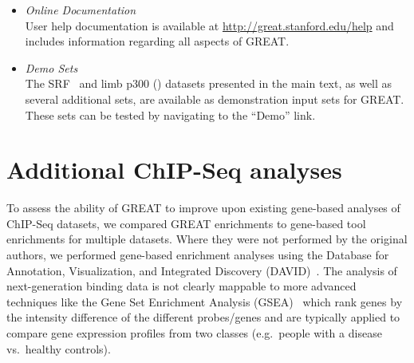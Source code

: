 \begin{itemize}
\item \emph{Online Documentation} \\
User help documentation is available at \url{http://great.stanford.edu/help} and includes information regarding all
aspects of GREAT.

\item \emph{Demo Sets}\\
The SRF~\citep{Valouev2008} and limb p300 (\citep{Visel2009}) datasets presented in
the main text, as well as several additional sets, are available as
demonstration input sets for GREAT.  These sets can be tested by navigating
to the ``Demo'' link.

\end{itemize}




\section{Additional ChIP-Seq analyses}
\label{XAddlChIPSeq} %
To assess the ability of GREAT to improve upon existing gene-based analyses of ChIP-Seq datasets,
we compared GREAT enrichments to gene-based tool enrichments for multiple datasets.
%
Where they were not performed by the original authors,
we performed gene-based enrichment analyses using the Database for Annotation,
Visualization, and Integrated Discovery (DAVID)~\citep{Huang2007}.  
%
The analysis of next-generation binding data is not clearly mappable to
more advanced techniques like the Gene Set Enrichment Analysis (GSEA)~\citep{Subramanian2005}
which rank genes by the intensity difference of the different probes/genes and are
typically applied to compare gene expression profiles from two classes (e.g.\ people
with a disease vs.\ healthy controls).

